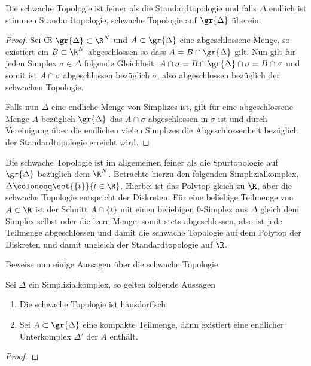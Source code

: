 \begin{Lem}
  Die schwache Topologie ist feiner als die Standardtopologie und
  falls $\Delta$ endlich ist stimmen Standardtopologie, schwache
  Topologie auf $\gr{\Delta}$ überein.
  \begin{proof}
    Sei \OE\; $\gr{\Delta} \subset \R^N$ und $A \subset \gr{\Delta}$
    eine abgeschlossene Menge, so existiert ein $B \subset \R^N$
    abgeschlossen so dass $A = B \cap \gr{\Delta}$ gilt. Nun gilt für
    jeden Simplex $\sigma \in \Delta$ folgende Gleichheit:
    $A \cap \sigma = B \cap \gr{\Delta} \cap \sigma = B \cap \sigma$
    und somit ist $A \cap \sigma$ abgeschlossen bezüglich $\sigma$,
    also abgeschlossen bezüglich der schwachen Topologie.
		
    Falls nun $\Delta$ eine endliche Menge von Simplizes ist, gilt für
    eine abgeschlossene Menge $A$ bezüglich $\gr{\Delta}$ das
    $A \cap \sigma$ abgeschlossen in $\sigma$ ist und durch
    Vereinigung über die endlichen vielen Simplizes die
    Abgeschlossenheit bezüglich der Standardtopologie erreicht wird.
  \end{proof}
\end{Lem}

\begin{Bem}
  Die schwache Topologie ist im allgemeinen feiner als die
  Spurtopologie auf $\gr{\Delta}$ bezüglich dem $\R^N$. Betrachte
  hierzu den folgenden Simplizialkomplex,
  $\Delta \coloneqq \set{ \{t\} }{t \in \R}$.  Hierbei ist das
  Polytop gleich zu $\R$, aber die schwache
  Topologie entspricht der Diskreten. Für eine beliebige
  Teilmenge von $A \subset \R$ ist der Schnitt $A \cap \{ t \}$ mit
  einen beliebigen $0$-Simplex aus $\Delta$ gleich dem Simplex selbst oder die leere Menge,
  somit stets abgeschlossen, also ist jede Teilmenge abgeschlossen und
  damit die schwache Topologie auf dem Polytop der Diskreten und
  damit ungleich der Standardtopologie auf $\R$.
\end{Bem}

Beweise nun einige Aussagen über die schwache Topologie.

\begin{Satz}
  Sei $\Delta$ ein Simplizialkomplex, so gelten folgende Aussagen
  \begin{enumerate}[(1)]
        \item Die schwache Topologie ist hausdorffsch.
        \item Sei $A \subset \gr{\Delta}$ eine kompakte Teilmenge,
          dann existiert eine endlicher Unterkomplex $\Delta'$ der $A$
          enthält.
	\end{enumerate}
	\begin{proof}
	\end{proof}
\end{Satz}

